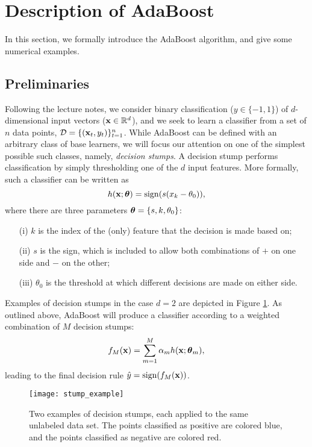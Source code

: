 \documentclass[english]{article}
\begin{document}
\section{Description of AdaBoost}

In this section, we formally introduce the AdaBoost algorithm, and give some numerical examples.

\subsection{Preliminaries}

Following the lecture notes, we consider binary classification ($y \in \{-1,1\}$) of $d$-dimensional input vectors ($\mathbf{x} \in \mathbb{R}^d$), and we seek to learn a classifier from a set of $n$ data points, $\mathcal{D} = \{(\mathbf{x}_t,y_t)\}_{t=1}^n$.  While AdaBoost can be defined with an arbitrary class of base learners, we will focus our attention on one of the simplest possible such classes, namely, {\em decision stumps}.  A decision stump performs classification by simply thresholding one of the $d$ input features.  More formally, such a classifier can be written as
    $$ h(\mathbf{x}; \boldsymbol{\theta}) = \mathrm{sign}( s(x_k - \theta_0) ), $$
where there are three parameters $\boldsymbol{\theta} = \{s,k,\theta_0\}$:
\begin{itemize}
    \item[(i)] $k$ is the index of the (only) feature that the decision is made based on;
    \item[(ii)] $s$ is the sign, which is included to allow both combinations of $+$ on one side and $-$ on the other;
    \item[(iii)] $\theta_0$ is the threshold at which different decisions are made on either side.
\end{itemize}
Examples of decision stumps in the case $d=2$ are depicted in Figure \ref{fig:stumps}.  As outlined above, AdaBoost will produce a classifier according to a weighted combination of $M$ decision stumps:
    \begin{equation}
        f_M(\mathbf{x}) = \sum_{m=1}^M \alpha_m h(\mathbf{x}; \boldsymbol{\theta}_m), \label{eq:fM}
    \end{equation}
leading to the final decision rule $\hat{y} = \mathrm{sign}( f_M(\mathbf{x}) )$.

    \begin{figure}
        \centering
        \texttt{[image: stump\_example]}
        \par
        \caption{Two examples of decision stumps, each applied to the same unlabeled data set.  The points classified as positive are colored blue, and the points classified as negative are colored red. \label{fig:stumps}}
    \end{figure}   
\end{document}
